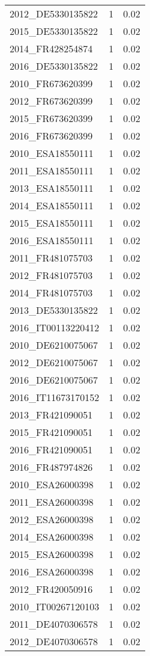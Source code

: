\begin{table*}[htbp]
\begin{tabular}{lrr}
2012_DE5330135822 & 1 & 0.02 \\
2015_DE5330135822 & 1 & 0.02 \\
2014_FR428254874 & 1 & 0.02 \\
2016_DE5330135822 & 1 & 0.02 \\
2010_FR673620399 & 1 & 0.02 \\
2012_FR673620399 & 1 & 0.02 \\
2015_FR673620399 & 1 & 0.02 \\
2016_FR673620399 & 1 & 0.02 \\
2010_ESA18550111 & 1 & 0.02 \\
2011_ESA18550111 & 1 & 0.02 \\
2013_ESA18550111 & 1 & 0.02 \\
2014_ESA18550111 & 1 & 0.02 \\
2015_ESA18550111 & 1 & 0.02 \\
2016_ESA18550111 & 1 & 0.02 \\
2011_FR481075703 & 1 & 0.02 \\
2012_FR481075703 & 1 & 0.02 \\
2014_FR481075703 & 1 & 0.02 \\
2013_DE5330135822 & 1 & 0.02 \\
2016_IT00113220412 & 1 & 0.02 \\
2010_DE6210075067 & 1 & 0.02 \\
2012_DE6210075067 & 1 & 0.02 \\
2016_DE6210075067 & 1 & 0.02 \\
2016_IT11673170152 & 1 & 0.02 \\
2013_FR421090051 & 1 & 0.02 \\
2015_FR421090051 & 1 & 0.02 \\
2016_FR421090051 & 1 & 0.02 \\
2016_FR487974826 & 1 & 0.02 \\
2010_ESA26000398 & 1 & 0.02 \\
2011_ESA26000398 & 1 & 0.02 \\
2012_ESA26000398 & 1 & 0.02 \\
2014_ESA26000398 & 1 & 0.02 \\
2015_ESA26000398 & 1 & 0.02 \\
2016_ESA26000398 & 1 & 0.02 \\
2012_FR420050916 & 1 & 0.02 \\
2010_IT00267120103 & 1 & 0.02 \\
2011_DE4070306578 & 1 & 0.02 \\
2012_DE4070306578 & 1 & 0.02 \\

\end{tabular}
\end{table*}
